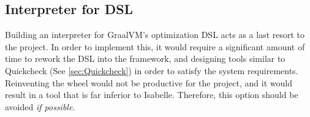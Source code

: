 \subsection{Interpreter for DSL}
\label{sec:DSLInterpreter}

Building an interpreter for GraalVM's optimization DSL acts as a last resort to the project. In order to implement this, it would require a significant 
amount of time to rework the DSL into the framework, and designing tools similar to Quickcheck (See \ref{sec:Quickcheck}) in order to satisfy the 
system requirements. Reinventing the wheel would not be productive for the project, and it would result in a tool that is far inferior to Isabelle.
Therefore, this option should be avoided \emph{if possible}.